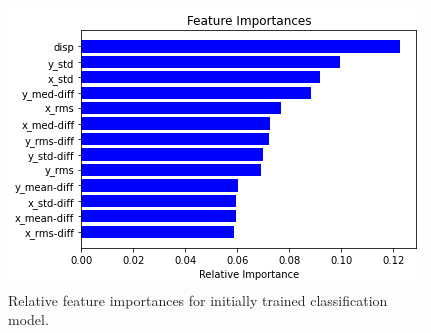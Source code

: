 \begin{figure}[h]
    \centering
    \includegraphics[width=\textwidth]{Images/Models/FI_RandomForestV1.png}
    \caption{Relative feature importances for initially trained classification model.}
    \label{fig:FI_RandomForestV1}
\end{figure}